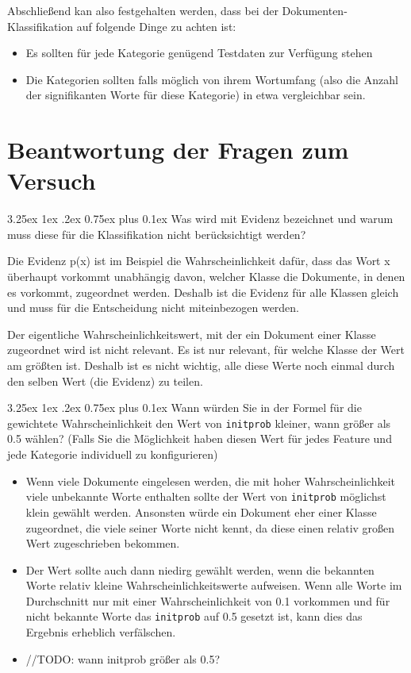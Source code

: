 \documentclass[12pt,a4paper]{scrartcl}
\makeatletter
\renewcommand\subparagraph{\@startsection{subparagraph}{5}{\parindent}%
    {3.25ex \@plus1ex \@minus .2ex}%
    {0.75ex plus 0.1ex}%
    {\normalfont\normalsize\bfseries}}
\makeatother
\begin{document}
Abschlie\ss end kan also festgehalten werden, dass bei der Dokumenten-Klassifikation auf folgende Dinge zu achten ist:
\begin{itemize}
\item{ Es sollten f\"ur jede Kategorie gen\"ugend Testdaten zur Verf\"ugung stehen}
\item{ Die Kategorien sollten falls m\"oglich von ihrem Wortumfang (also die Anzahl der signifikanten Worte f\"ur diese Kategorie) in etwa vergleichbar sein.}

\end{itemize}

\section*{Beantwortung der Fragen zum Versuch}
\subparagraph{Was wird mit Evidenz bezeichnet und warum muss diese f\"ur die Klassifikation nicht ber\"ucksichtigt werden?}

Die Evidenz p(x) ist im Beispiel die Wahrscheinlichkeit daf\"ur, dass das Wort x \"uberhaupt vorkommt unabh\"angig davon, welcher Klasse die Dokumente, in denen es vorkommt, zugeordnet werden.
Deshalb ist die Evidenz f\"ur alle Klassen gleich und muss f\"ur die Entscheidung nicht miteinbezogen werden. 

Der eigentliche Wahrscheinlichkeitswert, mit der ein Dokument einer Klasse zugeordnet wird ist nicht relevant. Es ist nur relevant, f\"ur welche Klasse der Wert am gr\"o\ss ten ist. Deshalb ist es nicht wichtig, alle diese Werte noch einmal durch den selben Wert (die Evidenz) zu teilen.

\subparagraph{Wann w\"urden Sie in der Formel f\"ur die gewichtete Wahrscheinlichkeit den Wert von \lstinline{initprob} kleiner, wann gr\"o\ss er als 0.5 w\"ahlen? (Falls Sie die M\"oglichkeit haben diesen Wert f\"ur jedes Feature und jede Kategorie individuell zu konfigurieren)}

\begin{itemize}
\item{ Wenn viele Dokumente eingelesen werden, die mit hoher Wahrscheinlichkeit viele unbekannte Worte enthalten sollte der Wert von \lstinline{initprob} m\"oglichst klein gew\"ahlt werden. Ansonsten w\"urde ein Dokument eher einer Klasse zugeordnet, die viele seiner Worte nicht kennt, da diese einen relativ gro\ss en Wert zugeschrieben bekommen. }
\item{ Der Wert sollte auch dann niedirg gew\"ahlt werden, wenn die bekannten Worte relativ kleine Wahrscheinlichkeitswerte aufweisen. Wenn alle Worte im Durchschnitt nur mit einer Wahrscheinlichkeit von 0.1 vorkommen und f\"ur nicht bekannte Worte das \lstinline{initprob} auf 0.5 gesetzt ist, kann dies das Ergebnis erheblich verf\"alschen.}
\item{ //TODO: wann initprob gr\"o\ss er als 0.5?} 
\end{itemize} 
\end{document}
